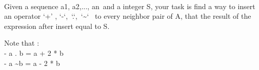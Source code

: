  

Given a sequence a1, a2,..., an and a integer S, your task is find a way to insert an operator ‘+’ , ‘-‘, ‘.‘, ‘\textasciitilde‘  to every neighbor pair of A, that the result of the expression after insert equal to S.

Note that :
\\- a . b = a + 2 * b
\\- a \textasciitilde b = a - 2 * b

 

\